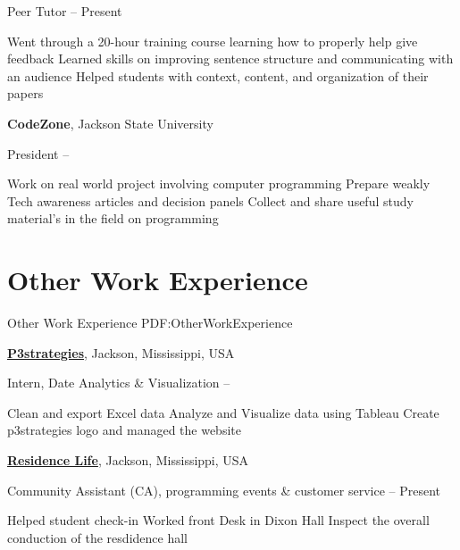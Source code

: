 \documentclass[letterpaper,10pt,oneside]{article}
\begin{document}
\begin{body}
\GapNoBreak
\BulletItem
Peer Tutor
\hfill
{} --
Present
\begin{detail}
\SubBulletItem
Went through a 20-hour training course learning how to properly help give feedback
\SubBulletItem
Learned skills on improving sentence structure and communicating with an audience
\SubBulletItem
Helped students with context, content, and organization of their papers 
\end{detail}

{\textbf{CodeZone}},
Jackson State University

\GapNoBreak
\BulletItem
President
\hfill
{} --
\begin{detail}
\SubBulletItem
Work on real world project involving computer programming
\SubBulletItem
Prepare weakly Tech awareness articles and decision panels
\SubBulletItem
Collect and share useful study material's in the field on programming 
\end{detail}




\section
{Other Work\newline
Experience}
{Other Work Experience}
{PDF:OtherWorkExperience}

\href{http://www.p3strategies.net/}
{\textbf{P3strategies}},
Jackson, Mississippi, USA

\GapNoBreak
\BulletItem
Intern,
Date Analytics \& Visualization 
\hfill
{} --
\begin{detail}
\SubBulletItem
Clean and export Excel data
\SubBulletItem
Analyze and Visualize data using Tableau
\SubBulletItem
Create p3strategies logo and managed the website
\end{detail}




\href{http://www.jsums.edu/housing/}
{\textbf{Residence Life}},
Jackson, Mississippi, USA

\GapNoBreak
\BulletItem
Community Assistant (CA),
programming events \& customer service 
\hfill
{} --
Present
\begin{detail}
\SubBulletItem
Helped student check-in
\SubBulletItem
Worked front Desk in Dixon Hall
\SubBulletItem
Inspect the overall conduction of the resdidence hall
\end{detail}


\end{body}
\end{document}
